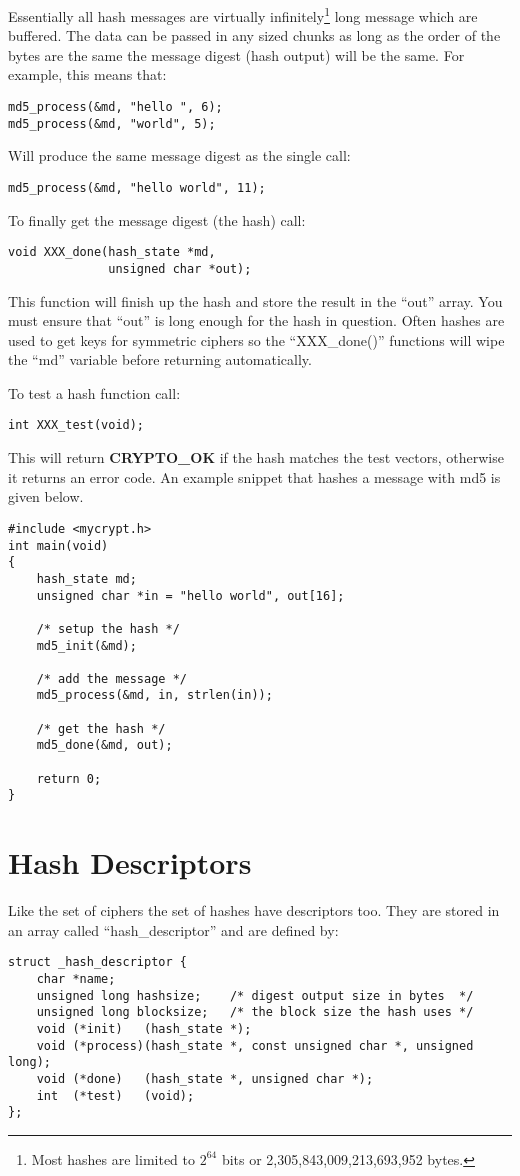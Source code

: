 \documentclass{book}
\begin{document}
Essentially all hash messages are virtually infinitely\footnote{Most hashes are limited to $2^{64}$ bits or 2,305,843,009,213,693,952 bytes.} long message which 
are buffered.  The data can be passed in any sized chunks as long as the order of the bytes are the same the message digest
(hash output) will be the same.  For example, this means that:
\begin{verbatim}
md5_process(&md, "hello ", 6);
md5_process(&md, "world", 5);
\end{verbatim}
Will produce the same message digest as the single call:
\begin{verbatim}
md5_process(&md, "hello world", 11);
\end{verbatim}

To finally get the message digest (the hash) call:
\begin{verbatim}
void XXX_done(hash_state *md, 
              unsigned char *out);
\end{verbatim}

This function will finish up the hash and store the result in the ``out'' array.  You must ensure that ``out'' is long
enough for the hash in question.  Often hashes are used to get keys for symmetric ciphers so the ``XXX\_done()'' functions
will wipe the ``md'' variable before returning automatically.

To test a hash function call:
\begin{verbatim}
int XXX_test(void);
\end{verbatim}

This will return {\bf CRYPTO\_OK} if the hash matches the test vectors, otherwise it returns an error code.  An
example snippet that hashes a message with md5 is given below.
\begin{small}
\begin{verbatim}
#include <mycrypt.h>
int main(void)
{
    hash_state md;
    unsigned char *in = "hello world", out[16];

    /* setup the hash */
    md5_init(&md);

    /* add the message */
    md5_process(&md, in, strlen(in));

    /* get the hash */
    md5_done(&md, out);

    return 0;
}
\end{verbatim}
\end{small}

\section{Hash Descriptors}
Like the set of ciphers the set of hashes have descriptors too.  They are stored in an array called ``hash\_descriptor'' and
are defined by:
\begin{verbatim}
struct _hash_descriptor {
    char *name;
    unsigned long hashsize;    /* digest output size in bytes  */
    unsigned long blocksize;   /* the block size the hash uses */
    void (*init)   (hash_state *);
    void (*process)(hash_state *, const unsigned char *, unsigned long);
    void (*done)   (hash_state *, unsigned char *);
    int  (*test)   (void);
};
\end{verbatim}
\end{document}
